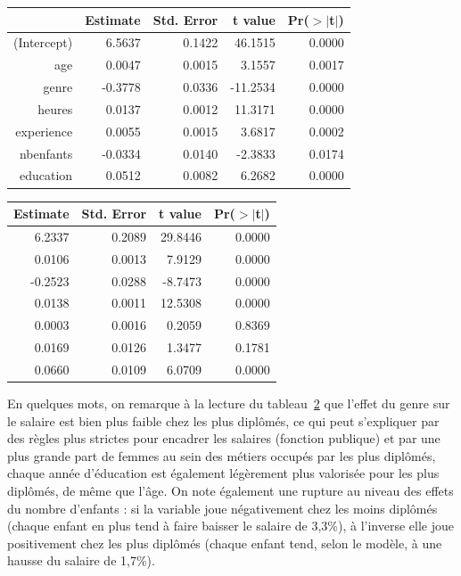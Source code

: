\documentclass[a4paper, french, 11 pt]{article}\usepackage[]{graphicx}\usepackage[]{xcolor}
\begin{document}
\begin{table}[htbp]
\label{tab:chow}
   \begin{minipage}[t]{0.4\linewidth}
   {\tiny
      \centering
\begin{tabular}{rrrrr}
  \toprule
 & Estimate & Std. Error & t value & Pr($>$$|$t$|$) \\ 
  \midrule
(Intercept) & 6.5637 & 0.1422 & 46.1515 & 0.0000 \\ 
  age & 0.0047 & 0.0015 & 3.1557 & 0.0017 \\ 
  genre & -0.3778 & 0.0336 & -11.2534 & 0.0000 \\ 
  heures & 0.0137 & 0.0012 & 11.3171 & 0.0000 \\ 
  experience & 0.0055 & 0.0015 & 3.6817 & 0.0002 \\ 
  nbenfants & -0.0334 & 0.0140 & -2.3833 & 0.0174 \\ 
  education & 0.0512 & 0.0082 & 6.2682 & 0.0000 \\ 
   \bottomrule
\end{tabular}}
   \end{minipage}
   \hspace{2cm}
   \begin{minipage}[t]{0.4\linewidth}
   {\tiny
      \centering
\begin{tabular}{rrrr}
  \toprule
Estimate & Std. Error & t value & Pr($>$$|$t$|$) \\ 
  \midrule
6.2337 & 0.2089 & 29.8446 & 0.0000 \\ 
0.0106 & 0.0013 & 7.9129 & 0.0000 \\ 
-0.2523 & 0.0288 & -8.7473 & 0.0000 \\ 
0.0138 & 0.0011 & 12.5308 & 0.0000 \\ 
0.0003 & 0.0016 & 0.2059 & 0.8369 \\ 
0.0169 & 0.0126 & 1.3477 & 0.1781 \\ 
0.0660 & 0.0109 & 6.0709 & 0.0000 \\ 
   \bottomrule
\end{tabular}}
   \end{minipage}
   \hfill
\end{table}

En quelques mots, on remarque à la lecture du tableau~\ref{tab:chow} que l'effet du genre sur le salaire est bien plus faible chez les plus diplômés, ce qui peut s'expliquer par des règles plus strictes pour encadrer les salaires (fonction publique) et par une plus grande part de femmes au sein des métiers occupés par les plus diplômés, chaque année d'éducation est également légèrement plus valorisée pour les plus diplômés, de même que l'âge. On note également une rupture au niveau des effets du nombre d'enfants : si la variable joue négativement chez les moins diplômés (chaque enfant en plus tend à faire baisser le salaire de 3,3\%), à l'inverse elle joue positivement chez les plus diplômés (chaque enfant tend, selon le modèle, à une hausse du salaire de 1,7\%).
\end{document}
